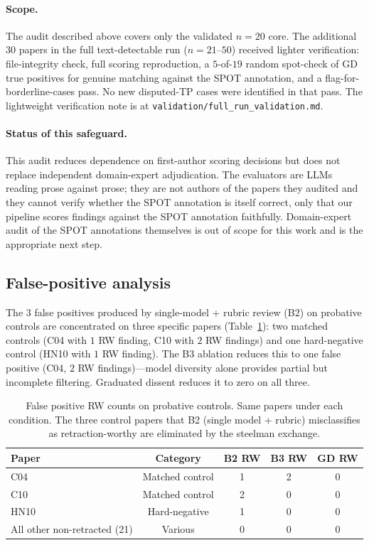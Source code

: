 \documentclass[11pt]{article}
\theoremstyle{definition}
\begin{document}
\paragraph{Scope.} The audit described above covers only the validated $n = 20$ core. The additional $30$ papers in the full text-detectable run ($n = 21$--$50$) received lighter verification: file-integrity check, full scoring reproduction, a $5$-of-$19$ random spot-check of GD true positives for genuine matching against the SPOT annotation, and a flag-for-borderline-cases pass. No new disputed-TP cases were identified in that pass. The lightweight verification note is at \texttt{validation/full\_run\_validation.md}.

\paragraph{Status of this safeguard.} This audit reduces dependence on first-author scoring decisions but does not replace independent domain-expert adjudication. The evaluators are LLMs reading prose against prose; they are not authors of the papers they audited and they cannot verify whether the SPOT annotation is itself correct, only that our pipeline scores findings against the SPOT annotation faithfully. Domain-expert audit of the SPOT annotations themselves is out of scope for this work and is the appropriate next step.

\subsection{False-positive analysis}

The $3$ false positives produced by single-model + rubric review (B2) on probative controls are concentrated on three specific papers (Table~\ref{tab:false_positives}): two matched controls (C04 with $1$ RW finding, C10 with $2$ RW findings) and one hard-negative control (HN10 with $1$ RW finding). The B3 ablation reduces this to one false positive (C04, $2$ RW findings)---model diversity alone provides partial but incomplete filtering. Graduated dissent reduces it to zero on all three.

\begin{table}[ht]
\centering
\caption{False positive RW counts on probative controls. Same papers under each condition. The three control papers that B2 (single model + rubric) misclassifies as retraction-worthy are eliminated by the steelman exchange.}
\label{tab:false_positives}
\small
\begin{tabular}{lcccc}
\toprule
\textbf{Paper} & \textbf{Category} & \textbf{B2 RW} & \textbf{B3 RW} & \textbf{GD RW} \\
\midrule
C04   & Matched control     & 1 & 2 & 0 \\
C10   & Matched control     & 2 & 0 & 0 \\
HN10  & Hard-negative       & 1 & 0 & 0 \\
\midrule
All other non-retracted (21) & Various & 0 & 0 & 0 \\
\bottomrule
\end{tabular}
\end{table}
\end{document}
